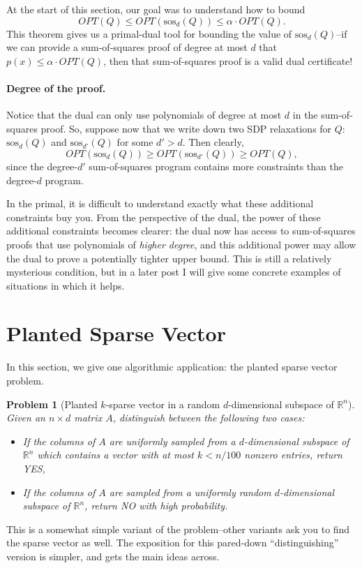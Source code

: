 \documentclass[a4paper,11pt]{article}
\newcommand{\R}{\mathbb{R}}
\newcommand{\sos}{\mathrm{sos}}
\newtheorem{problem}{Problem}
\theoremstyle{definition}
\begin{document}
At the start of this section, our goal was to understand how to bound
\[
OPT(Q) \le OPT(\sos_d(Q)) \le \alpha \cdot OPT(Q).
\]
This theorem gives us a primal-dual tool for bounding the value of $\sos_d(Q)$--{if we can provide a sum-of-squares proof of degree at most $d$ that $p(x) \le \alpha\cdot OPT(Q)$, then that sum-of-squares proof is a valid dual certificate!}

\paragraph{Degree of the proof.}
Notice that the dual can only use polynomials of degree at most $d$ in the sum-of-squares proof.
So, suppose now that we write down two SDP relaxations for $Q$: $\sos_d(Q)$ and $\sos_{d'}(Q)$ for some $d' > d$.
Then clearly, 
\[
OPT(\sos_{d}(Q)) \ge OPT(\sos_{d'}(Q)) \ge OPT(Q),
\]
since the degree-$d'$ sum-of-squares program contains more constraints than the degree-$d$ program.

In the primal, it is difficult to understand exactly what these additional constraints buy you.
From the perspective of the dual, the power of these additional constraints becomes clearer: the dual now has access to sum-of-squares proofs that use polynomials of {\em higher degree}, and this additional power may allow the dual to prove a potentially tighter upper bound.
This is still a relatively mysterious condition, but in a later post I will give some concrete examples of situations in which it helps.



\section{Planted Sparse Vector}

In this section, we give one algorithmic application: the planted sparse vector problem.

\begin{problem}[Planted $k$-sparse vector in a random $d$-dimensional subspace of $\R^n$]
Given an $n \times d$ matrix $A$, distinguish between the following two cases:
\begin{itemize}
\item If the columns of $A$ are uniformly sampled from a $d$-dimensional subspace of $\R^n$ which contains a vector with at most $k < n/100$ nonzero entries, return YES,
\item If the columns of $A$ are sampled from a uniformly random $d$-dimensional subspace of $\R^n$, return NO with high probability.
\end{itemize}
\end{problem}
This is a somewhat simple variant of the problem--other variants ask you to find the sparse vector as well. 
The exposition for this pared-down ``distinguishing'' version is simpler, and gets the main ideas across.
\end{document}
